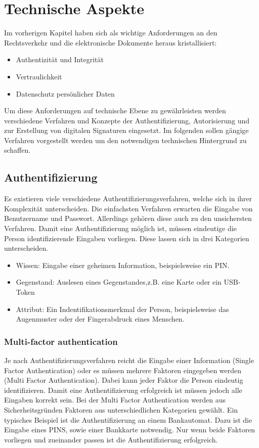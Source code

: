 
\section{Technische Aspekte}
Im vorherigen Kapitel haben sich als wichtige Anforderungen an den Rechtsverkehr und die elektronische Dokumente heraus kristallisiert:
\begin{itemize}
\item Authentizität und Integrität
\item Vertraulichkeit
\item Datenschutz persönlicher Daten
\end{itemize}
Um diese Anforderungen auf technische Ebene zu gewährleisten werden verschiedene Verfahren und Konzepte der Authentifizierung, Autorisierung und zur Erstellung von digitalen Signaturen eingesetzt. Im folgenden sollen gängige Verfahren vorgestellt werden um den notwendigen  technischen Hintergrund zu schaffen. 
\subsection*{Authentifizierung}
Es existieren viele verschiedene Authentifizierungsverfahren, welche sich in ihrer Komplexität unterscheiden. Die einfachsten Verfahren erwarten die Eingabe von Benutzername und Passwort. Allerdings gehören diese auch zu den unsichersten Verfahren. Damit eine Authentifizierung möglich ist, müssen eindeutige die Person identifizierende Eingaben vorliegen. Diese lassen sich in drei Kategorien unterscheiden.
\begin{itemize}
\item Wissen: Eingabe einer geheimen Information, beispielsweise ein PIN.
\item Gegenstand: Auslesen eines Gegenstandes,z.B. eine Karte oder ein USB-Token
\item Attribut: Ein Indentifikationsmerkmal der Person, beispielsweise das Augenmuster oder der Fingerabdruck eines Menschen.
\end{itemize}
\subsubsection{Multi-factor authentication}
Je nach Authentifizierungsverfahren reicht die Eingabe einer Information (Single Factor Authentication) oder es müssen mehrere Faktoren eingegeben werden (Multi Factor Authentication).
Dabei kann jeder Faktor die Person eindeutig identifizieren. Damit eine Authentifizierung erfolgreich ist müssen jedoch alle Eingaben korrekt sein. Bei der Multi Factor Authentication werden aus Sicherheitsgründen Faktoren aus unterschiedlichen Kategorien gewählt. Ein typisches Beispiel ist die Authentifizierung an einem Bankautomat. Dazu ist die Eingabe eines PINS, sowie einer Bankkarte notwendig. Nur wenn beide Faktoren vorliegen und zueinander passen ist die Authentifizierung erfolgreich. 
